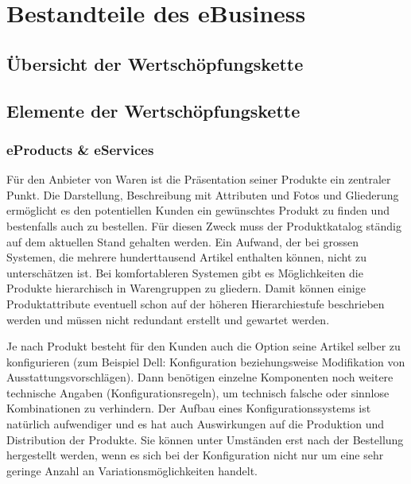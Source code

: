 \section{Bestandteile des eBusiness}
\label{sec:ebusiness}

\subsection{Übersicht der Wertschöpfungskette}



\subsection{Elemente der Wertschöpfungskette}
\label{subsec:value-chain}



\subsubsection*{eProducts \& eServices}

Für den Anbieter von Waren ist die Präsentation seiner Produkte ein
zentraler Punkt. Die Darstellung, Beschreibung mit Attributen und
Fotos und Gliederung ermöglicht es den potentiellen Kunden ein
gewünschtes Produkt zu finden und bestenfalls auch zu bestellen. Für
diesen Zweck muss der Produktkatalog ständig auf dem aktuellen Stand
gehalten werden. Ein Aufwand, der bei grossen Systemen, die mehrere
hunderttausend Artikel enthalten können, nicht zu unterschätzen ist.
Bei komfortableren Systemen gibt es Möglichkeiten die Produkte hierarchisch
in Warengruppen zu gliedern. Damit können einige Produktattribute eventuell
schon auf der höheren Hierarchiestufe beschrieben werden und müssen
nicht redundant erstellt und gewartet werden.

Je nach Produkt besteht für den Kunden auch die Option seine Artikel
selber zu konfigurieren (zum Beispiel Dell: Konfiguration beziehungsweise
Modifikation von Ausstattungsvorschlägen). Dann benötigen einzelne
Komponenten noch weitere technische Angaben (Konfigurationsregeln), um
technisch falsche oder sinnlose Kombinationen zu verhindern. Der Aufbau
eines Konfigurationssystems ist natürlich aufwendiger und es hat auch
Auswirkungen auf die Produktion und Distribution der Produkte. Sie können
unter Umständen erst nach der Bestellung hergestellt werden, wenn es
sich bei der Konfiguration nicht nur um eine sehr geringe Anzahl an
Variationsmöglichkeiten handelt.

